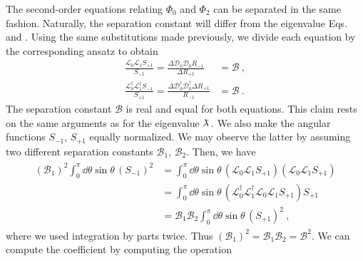 The second-order equations relating $\Phi_0$ and $\Phi_2$ can be separated in the same fashion. Naturally, the separation constant will differ from the eigenvalue Eqs.  and .
Using the same substitutions made previously, we divide each equation by the corresponding ansatz to obtain
\begin{align}
    \label{eq3:separationB}
    \frac{\mathscr{L}_0 \mathscr{L}_1 S_{+1}}{S_{-1}} = \frac{\Delta \mathscr{D}_0 \mathscr{D}_0 R_{-1}}{\Delta R_{+1}} &= \mathscr{B} ~, \\
    \label{eq3:separationBdagger}
    \frac{\mathscr{L}^\dagger_0 \mathscr{L}^\dagger_1 S_{-1}}{S_{+1}} = \frac{\Delta \mathscr{D}^\dagger_0 \mathscr{D}^\dagger_0 \Delta R_{+1}}{R_{-1}} &= \mathscr{B} ~.
\end{align}
The separation constant $\mathscr{B}$ is real and equal for both equations. This claim rests on the same arguments as for the eigenvalue $\lambdabar$. We also make the angular functions $S_{-1}$, $S_{+1}$ equally normalized. We may observe the latter by assuming two different separation constants $\mathscr{B}_1$, $\mathscr{B}_2$. Then, we have
\begin{align}
    \begin{split}
        (\mathscr{B}_1)^2 \int_0^\pi \dd\theta \sin\theta \, (S_{-1})^2 &=
        \int_0^\pi \dd\theta \sin\theta \, ( \mathscr{L}_0 \mathscr{L}_1  S_{+1} )( \mathscr{L}_0 \mathscr{L}_1  S_{+1} ) \\
        &= \int_0^\pi \dd\theta \sin\theta \, ( \mathscr{L}^\dagger_0 \mathscr{L}^\dagger_1 \mathscr{L}_0 \mathscr{L}_1  S_{+1} ) S_{+1} \\
        &=  \mathscr{B}_1 \mathscr{B}_2 \int_0^\pi \dd\theta \sin\theta \, (S_{+1})^2 ~,
    \end{split}
\end{align}
where we used integration by parts twice.
Thus $(\mathscr{B}_1)^2 = \mathscr{B}_1 \mathscr{B}_2 = \mathscr{B}^2$.
We can compute the coefficient by computing the operation
